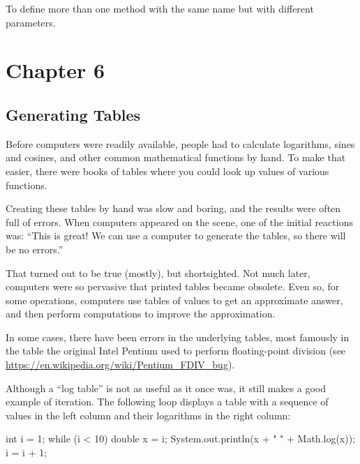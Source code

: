 \begin{description}

To define more than one method with the same name but with different parameters.

\end{description}


\section{Chapter 6}

\subsection*{Generating Tables}


Before computers were readily available, people had to calculate logarithms, sines and cosines, and other common mathematical functions by hand.
To make that easier, there were books of tables where you could look up values of various functions.

Creating these tables by hand was slow and boring, and the results were often full of errors.
When computers appeared on the scene, one of the initial reactions was: ``This is great!
We can use a computer to generate the tables, so there will be no errors.''

That turned out to be true (mostly), but shortsighted.
Not much later, computers were so pervasive that printed tables became obsolete.
Even so, for some operations, computers use tables of values to get an approximate answer, and then perform computations to improve the approximation.


In some cases, there have been errors in the underlying tables, most famously in the table the original Intel Pentium used to perform floating-point division (see \url{https://en.wikipedia.org/wiki/Pentium_FDIV_bug}).

Although a ``log table'' is not as useful as it once was, it still makes a good example of iteration.
The following loop displays a table with a sequence of values in the left column and their logarithms in the right column:

\begin{code}
int i = 1;
while (i < 10) {
    double x = i;
    System.out.println(x + "   " + Math.log(x));
    i = i + 1;
}
\end{code}

